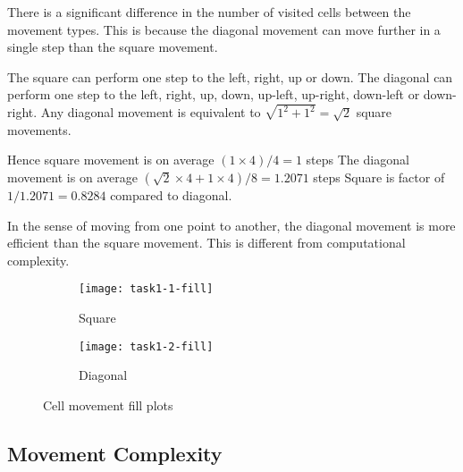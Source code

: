 There is a significant difference in the number of visited cells between the movement types.
This is because the diagonal movement can move further in a single step than the square movement.

The square can perform one step to the left, right, up or down.
The diagonal can perform one step to the left, right, up, down, up-left, up-right, down-left or down-right.
Any diagonal movement is equivalent to $\sqrt{1^2 + 1^2} = \sqrt{2}$ square movements.

Hence square movement is on average $(1 \times 4) / 4 = 1$ steps
The diagonal movement is on average $(\sqrt{2} \times 4 + 1 \times 4) / 8 = 1.2071$ steps
Square is factor of $1 / 1.2071 = 0.8284$ compared to diagonal.

In the sense of moving from one point to another, the diagonal movement is more efficient than the square movement.
This is different from computational complexity.



\clearpage

\begin{figure}[ht]
    \centering
    \begin{subfigure}{\textwidth}
        \centering
        \texttt{[image: task1-1-fill]}
        \caption[Square]{Square}
        \label{fig:task1-1-fill}
    \end{subfigure}
    \begin{subfigure}{\textwidth}
        \centering
        \texttt{[image: task1-2-fill]}
        \caption[Diagonal]{Diagonal}
        \label{fig:task1-2-fill}
    \end{subfigure}
    \caption[Cell movement fill plots]{Cell movement fill plots}
    \label{fig:task1-fill}
\end{figure}

\clearpage

\subsection{Movement Complexity}

